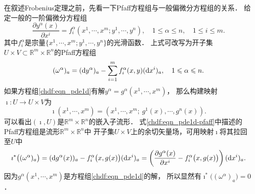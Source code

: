 在叙述Frobenius定理之前，先看一下Pfaff方程组与一般偏微分方程组的关系．
给定一般的一阶偏微分方程组
\begin{equation}\label{chdf:eqn_pde1d}
    \frac{\partial y^\alpha(x)}{\partial x^i} = f_i ^\alpha (x^1,\cdots, x^m;y^1,\cdots,y^n),
    \quad 1 \leqslant \alpha \leqslant n, \quad 1 \leqslant i \leqslant m .
\end{equation}
其中$f_i ^\alpha$是宗量$\{x^1,\cdots, x^m;y^1,\cdots,y^n\}$的光滑函数．
上式可改写为开子集$U\times V\subset \mathbb{R}^m\times \mathbb{R}^n$的Pfaff方程组
\begin{equation}\label{chdf:eqn_pde1d-pfaff}
    (\omega^\alpha)_a = ({\rm d}y^\alpha)_a - \sum_{i=1}^{m}f_i ^\alpha(x,y)({\rm d}x^i)_a,
     \quad 1 \leqslant \alpha \leqslant n.
\end{equation}
如果方程组\eqref{chdf:eqn_pde1d}有解$y^\alpha=g^\alpha(x^1,\cdots, x^m)$，
那么构建映射$\imath:U\to U\times V$为
\begin{equation}
    \imath(x^1,\cdots, x^m)=\left(x^1,\cdots, x^m;\ g^1(x),\cdots,g^n(x)\right).
\end{equation}
可以看出$(\imath,U)$是$\mathbb{R}^m\times \mathbb{R}^n$的嵌入子流形．
式\eqref{chdf:eqn_pde1d-pfaff}中描述的Pfaff方程组是流形$\mathbb{R}^m\times \mathbb{R}^n$中
开子集$U\times V$上的余切矢量场，可用映射$\imath$将其拉回至$U$中
\begin{equation*}
    \imath^*\bigl((\omega^\alpha)_a\bigr)=({\rm d}g^\alpha(x))_a - f_i ^\alpha\bigl(x,g(x)\bigr)({\rm d}x^i)_a
    =\left( \frac{\partial g^\alpha(x)}{\partial x^i} -f_i ^\alpha\bigl(x,g(x)\bigr) \right)({\rm d}x^i)_a .
\end{equation*}
因为$g^\alpha(x^1,\cdots, x^m)$是方程组\eqref{chdf:eqn_pde1d}的解，
所以显然有$\imath^*\bigl((\omega^\alpha)_a\bigr)=0$．



